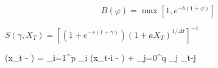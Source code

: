 \documentclass{article}
\begin{document}
\[B\left( \varphi  \right)=\max \left[ 1,{{e}^{-b\left( 1+\varphi  \right)}} \right]\]

$S\left( \gamma ,{{X}_{T}} \right)={{\left[ \left( 1+{{e}^{-s\left( 1+\gamma  \right)}} \right){{\left( 1+a{{X}_{T}} \right)}^{1/\Delta t}} \right]}^{-1}}$

(x_t - \mu) = \sum_{i=1}^p \varphi_i (x_{t-i} - \mu) +  \sum_{j=0}^q \theta_j \epsilon_{t-j}
\end{document}
